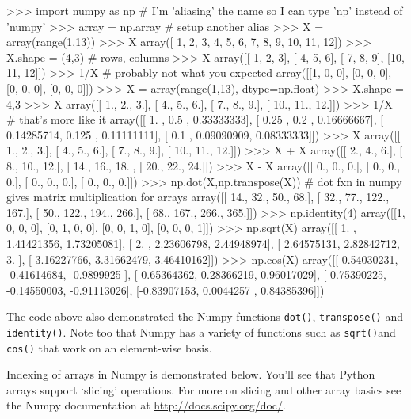 \begin{python}
>>> import numpy as np # I'm 'aliasing' the name so I can type 'np' instead of 'numpy'
>>> array = np.array # setup another alias
>>> X = array(range(1,13))
>>> X
array([ 1,  2,  3,  4,  5,  6,  7,  8,  9, 10, 11, 12])
>>> X.shape = (4,3) # rows, columns
>>> X
array([[ 1,  2,  3],
       [ 4,  5,  6],
       [ 7,  8,  9],
       [10, 11, 12]])
>>> 1/X # probably not what you expected
array([[1, 0, 0],
       [0, 0, 0],
       [0, 0, 0],
       [0, 0, 0]])
>>> X = array(range(1,13), dtype=np.float)
>>> X.shape = 4,3
>>> X
array([[  1.,   2.,   3.],
       [  4.,   5.,   6.],
       [  7.,   8.,   9.],
       [ 10.,  11.,  12.]])
>>> 1/X # that's more like it
array([[ 1.        ,  0.5       ,  0.33333333],
       [ 0.25      ,  0.2       ,  0.16666667],
       [ 0.14285714,  0.125     ,  0.11111111],
       [ 0.1       ,  0.09090909,  0.08333333]])
>>> X
array([[  1.,   2.,   3.],
       [  4.,   5.,   6.],
       [  7.,   8.,   9.],
       [ 10.,  11.,  12.]])
>>> X + X
array([[  2.,   4.,   6.],
       [  8.,  10.,  12.],
       [ 14.,  16.,  18.],
       [ 20.,  22.,  24.]])
>>> X - X
array([[ 0.,  0.,  0.],
       [ 0.,  0.,  0.],
       [ 0.,  0.,  0.],
       [ 0.,  0.,  0.]])
>>> np.dot(X,np.transpose(X)) # dot fxn in numpy gives matrix multiplication for arrays
array([[  14.,   32.,   50.,   68.],
       [  32.,   77.,  122.,  167.],
       [  50.,  122.,  194.,  266.],
       [  68.,  167.,  266.,  365.]])
>>> np.identity(4)
array([[1, 0, 0, 0],
       [0, 1, 0, 0],
       [0, 0, 1, 0],
       [0, 0, 0, 1]])
>>> np.sqrt(X)
array([[ 1.        ,  1.41421356,  1.73205081],
       [ 2.        ,  2.23606798,  2.44948974],
       [ 2.64575131,  2.82842712,  3.        ],
       [ 3.16227766,  3.31662479,  3.46410162]])
>>> np.cos(X)
array([[ 0.54030231, -0.41614684, -0.9899925 ],
       [-0.65364362,  0.28366219,  0.96017029],
       [ 0.75390225, -0.14550003, -0.91113026],
       [-0.83907153,  0.0044257 ,  0.84385396]])
\end{python}

The code above also demonstrated the Numpy functions \lstinline!dot()!,
\lstinline!transpose()! and \lstinline!identity()!. Note too that Numpy
has a variety of functions such as \lstinline!sqrt()!and
\lstinline!cos()! that work on an element-wise basis.

Indexing of arrays in Numpy is demonstrated below. You'll see that
Python arrays support `slicing' operations. For more on slicing and
other array basics see the Numpy documentation at
\href{http://docs.scipy.org/doc/}{http://docs.scipy.org/doc/}.

